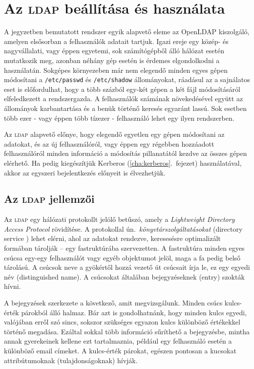 \chapter{Az \textsc{ldap} beállítása és használata}\label{cha:ldap}

A jegyzetben bemutatott rendszer egyik alapvető eleme az OpenLDAP kiszolgáló, amelyen elsősorban a felhasználók adatait
tartjuk. Igazi ereje egy közép- és nagyvállalati, vagy éppen egyetemi, sok számítógépből álló hálózat esetén mutatkozik
meg, azonban néhány gép esetén is érdemes elgondolkodni a használatán. Sokgépes környezeben már nem elegendő  minden
egyes gépen módosítani a \texttt{/etc/passwd} és \texttt{/etc/shadow} állományokat, ráadásul az a sajnálatos eset is
előfordulhat, hogy a több százból egy-két gépen a két fájl módosításáról elfeledkezett a rendszergazda. A felhasználók
számának növekedésével együtt az állományok karbantartása és a benük történő keresés egyaránt lassú. Sok esetben több
ezer - vagy éppen több tízezer - felhasználó lehet egy ilyen rendszerben.

Az \textsc{ldap} alapvető előnye, hogy elegendő egyetlen egy gépen módosítani az adatokat, és az új felhasználóról, vagy
éppen egy régebben hozzáadott felhasználóról  minden információ a módosítás pillanatától kezdve az összes gépen
elérhető.  Ha pedig kiegészítjük Kerberos (\ref{cha:kerberos}.\ fejezet) használatával, akkor az egyszeri bejelentkezés
előnyeit is élvezhetjük.


\section{Az \textsc{ldap} jellemzői}

Az \textsc{ldap}  egy hálózati protokollt jelölő betűszó, amely a {\em Lightweight Directory Access Protocol}
rövidítése. A protokollal ún.\ \emph{könyvtárszolgáltatásokat}  (directory service \cite{dirservice}) lehet elérni, ahol
az adatokat rendezve, keresesésre optimalizált formában tárolják -- egy fastruktúrába szervezetten. A fastruktúra minden
egyes csúcsa egy-egy felhasználót vagy egyéb objektumot jelöl, maga a fa pedig belső tárolású. A csúcsok neve a
gyökértől hozzá vezető út csúcsait írja le, ez egy egyedi név (distinguished name). A csúcsokat általában bejegyzéseknek
(entry) szokták hívni.

A bejegyzések szerkezete a következő, amit megvizsgálunk. Minden csúcs kulcs-érték párokból álló halmaz. Bár azt is
gondolhatnánk, hogy minden kulcs egyedi, valójában erről szó sincs, sokszor szükséges egyazon kulcs különböző értékekkel
történő megadása. Ezáltal sokkal több információ sűríthető a bejegyzésbe, mintha annak gyerekeinek kellene ezt
tartalmaznia, például egy felhasználó esetén a különböző email címeket. A kulcs-érték párokat, egészen pontosan a
kucsokat attribútumoknak (tulajdonságoknak) hívják.

